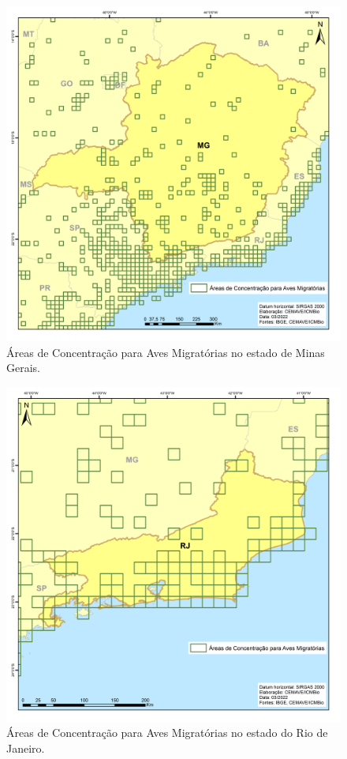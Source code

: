 \documentclass[
  oneside]{scrbook}
\begin{document}
\begin{figure}[H]

{\centering \includegraphics[width=0.75\linewidth]{imagens/cap07/Figura_7.28_MG} 

}

\caption{Áreas de Concentração para Aves Migratórias no estado de Minas Gerais.}\label{fig:48}
\end{figure}

\begin{figure}[H]

{\centering \includegraphics[width=0.75\linewidth]{imagens/cap07/Figura_7.29_RJ} 

}

\caption{Áreas de Concentração para Aves Migratórias no estado do Rio de Janeiro.}\label{fig:49}
\end{figure}
\end{document}
